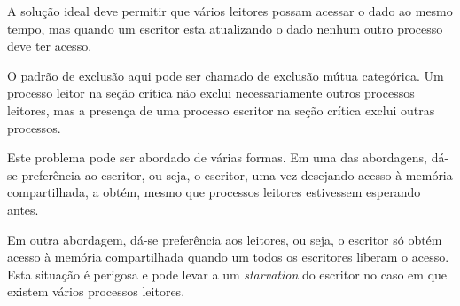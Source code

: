 	A solução ideal deve permitir que vários leitores possam acessar o dado ao mesmo tempo, mas quando um escritor esta atualizando o dado nenhum outro processo deve ter acesso.
		
	O padrão de exclusão aqui pode ser chamado de exclusão mútua categórica. Um processo leitor na seção crítica não exclui necessariamente outros processos leitores, mas a presença de uma processo escritor na seção crítica exclui outras processos.
	
	Este problema pode ser abordado de várias formas. Em uma das abordagens, dá-se preferência ao escritor, ou seja, o escritor, uma vez desejando acesso à memória compartilhada, a obtém, mesmo que processos leitores estivessem esperando antes.
	
	Em outra abordagem, dá-se preferência aos leitores, ou seja, o escritor só obtém acesso à memória compartilhada quando um todos os escritores liberam o acesso. Esta situação é perigosa e pode levar a um \textit{starvation} do escritor no caso em que existem vários processos leitores.